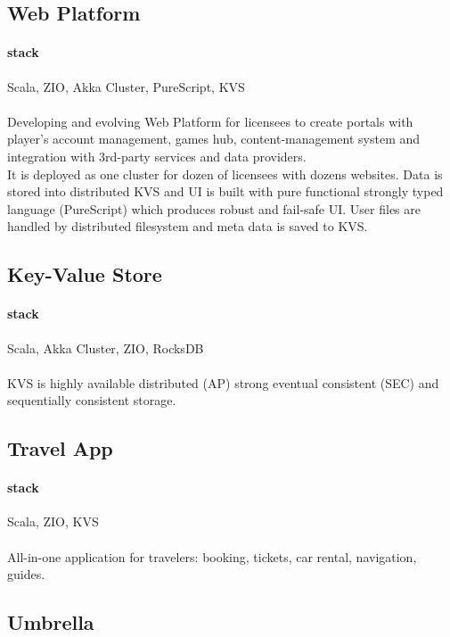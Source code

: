 \subsection{Web Platform}
\paragraph{stack} Scala, ZIO, Akka Cluster, PureScript, KVS
\paragraph{}
Developing and evolving Web Platform for licensees to create portals with player's account management, games hub, content-management system and integration with 3rd-party services and data providers.\\
It is deployed as one cluster for dozen of licensees with dozens websites. Data is stored into distributed KVS and UI is built with pure functional strongly typed language (PureScript) which produces robust and fail-safe UI. User files are handled by distributed filesystem and meta data is saved to KVS.

\subsection{Key-Value Store}
\paragraph{stack} Scala, Akka Cluster, ZIO, RocksDB
\paragraph{}
KVS is highly available distributed (AP) strong eventual consistent (SEC) and sequentially consistent storage.

\subsection{Travel App}
\paragraph{stack} Scala, ZIO, KVS
\paragraph{}
All-in-one application for travelers: booking, tickets, car rental, navigation, guides.

\subsection{Umbrella}
